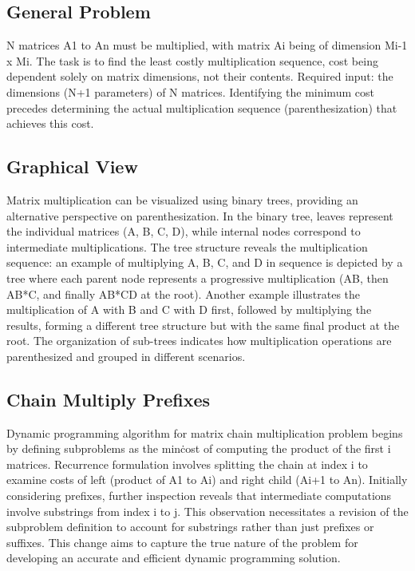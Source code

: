 \subsection*{General Problem}
N matrices A1 to An must be multiplied, with matrix Ai being of dimension Mi-1 x Mi.
The task is to find the least costly multiplication sequence, cost being dependent solely on matrix dimensions, not their contents.
Required input: the dimensions (N+1 parameters) of N matrices.
Identifying the minimum cost precedes determining the actual multiplication sequence (parenthesization) that achieves this cost.

\subsection*{Graphical View}
Matrix multiplication can be visualized using binary trees, providing an alternative perspective on parenthesization.
In the binary tree, leaves represent the individual matrices (A, B, C, D), while internal nodes correspond to intermediate multiplications.
The tree structure reveals the multiplication sequence: an example of multiplying A, B, C, and D in sequence is depicted by a tree where each parent node represents a progressive multiplication (AB, then AB*C, and finally AB*CD at the root).
Another example illustrates the multiplication of A with B and C with D first, followed by multiplying the results, forming a different tree structure but with the same final product at the root.
The organization of sub-trees indicates how multiplication operations are parenthesized and grouped in different scenarios.

\subsection*{Chain Multiply  Prefixes}
Dynamic programming algorithm for matrix chain multiplication problem begins by defining subproblems as the min\. cost of computing the product of the first i matrices.
Recurrence formulation involves splitting the chain at index i to examine costs of left (product of A1 to Ai) and right child (Ai+1 to An).
Initially considering prefixes, further inspection reveals that intermediate computations involve substrings from index i to j.
This observation necessitates a revision of the subproblem definition to account for substrings rather than just prefixes or suffixes.
This change aims to capture the true nature of the problem for developing an accurate and efficient dynamic programming solution.

